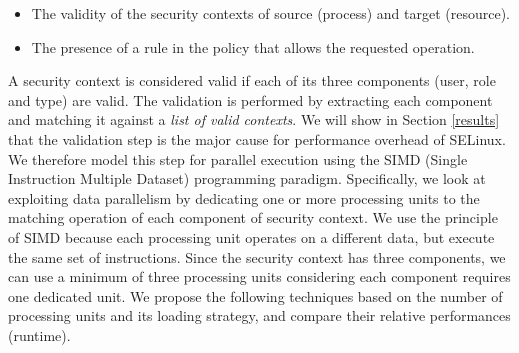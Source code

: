 \documentclass[conference]{IEEEtran}
\begin{document}
\begin{itemize}

\item The validity of the security contexts of source (process) and target (resource).
\item The presence of a rule in the policy that allows the requested operation. 

\end{itemize}

A security context is considered valid if each of its three components
(user, role and type) are valid. The validation is performed by
extracting each component and matching it against a \emph{list of
  valid contexts}. We will show in Section \ref{results} that the
validation step is the major cause for performance overhead of
SELinux. We therefore model this step for parallel execution using the
SIMD (Single Instruction Multiple Dataset) programming
paradigm. Specifically, we look at exploiting data parallelism by
dedicating one or more processing units to the matching operation of
each component of security context. We use the principle of SIMD
because each processing unit operates on a different data, but execute
the same set of instructions. Since the security context has three
components, we can use a minimum of three processing units considering
each component requires one dedicated unit. We propose the following
techniques based on the number of processing units and its loading
strategy, and compare their relative performances (runtime).
\end{document}
